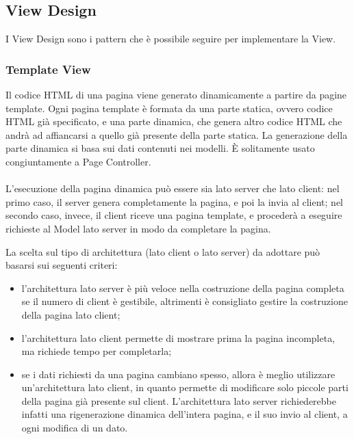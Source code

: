 \subsection{View Design}
I View Design sono i pattern che è possibile seguire per implementare la View.

\subsubsection{Template View}
Il codice HTML di una pagina viene generato dinamicamente a partire da pagine template. Ogni pagina template è formata da una parte statica, ovvero codice HTML già specificato, e una parte dinamica, che genera altro codice HTML che andrà ad affiancarsi a quello già presente della parte statica.
La generazione della parte dinamica si basa sui dati contenuti nei modelli.
È solitamente usato congiuntamente a Page Controller.\\
\\
L'esecuzione della pagina dinamica può essere sia lato server che lato client: nel primo caso, il server genera completamente la pagina, e poi la invia al client; nel secondo caso, invece, il client riceve una pagina template, e procederà a eseguire richieste al Model lato server in modo da completare la pagina.

La scelta sul tipo di architettura (lato client o lato server) da adottare può basarsi sui seguenti criteri:
\begin{itemize}
    \item l'architettura lato server è più veloce nella costruzione della pagina completa se il numero di client è gestibile, altrimenti è consigliato gestire la costruzione della pagina lato client;
    \item l'architettura lato client permette di mostrare prima la pagina incompleta, ma richiede tempo per completarla;
    \item se i dati richiesti da una pagina cambiano spesso, allora è meglio utilizzare un'architettura lato client, in quanto permette di modificare solo piccole parti della pagina già presente sul client.
    L'architettura lato server richiederebbe infatti una rigenerazione dinamica dell'intera pagina, e il suo invio al client, a ogni modifica di un dato.
\end{itemize}

